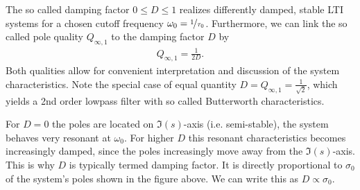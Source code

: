 \documentclass[11pt,a4paper,DIV=12]{scrartcl}
\numberwithin{equation}{section}
\numberwithin{figure}{section}
\begin{document}
\begin{mdframed}
The so called damping factor $0\leq D \leq 1$ realizes differently damped,
stable LTI systems for a chosen cutoff frequency $\omega_0=\nicefrac{1}{\tau_0}$.
Furthermore, we can link the so called pole quality $Q_{\infty,1} $ to the damping factor
$D$ by
\begin{align}
Q_{\infty,1} = \frac{1}{2 D}.
\end{align}
Both qualities allow for convenient interpretation and discussion of the
system characteristics. Note the special case of equal quantity
$D = Q_{\infty,1} = \frac{1}{\sqrt{2}}$, which yields a 2nd order
lowpass filter with so called Butterworth characteristics.
\begin{center}
%
\end{center}
%
For $D=0$ the poles are located on $\Im(s)$-axis (i.e. semi-stable),
the system behaves very resonant at $\omega_0$.
For higher $D$ this resonant characteristics becomes increasingly
damped, since the poles increasingly move away from the $\Im(s)$-axis.
%
This is why $D$ is typically termed damping factor. It is directly
proportional to $\sigma_0$ of the system's poles shown in the figure above.
We can write this as $D\propto \sigma_0$.


\end{mdframed}
\end{document}
